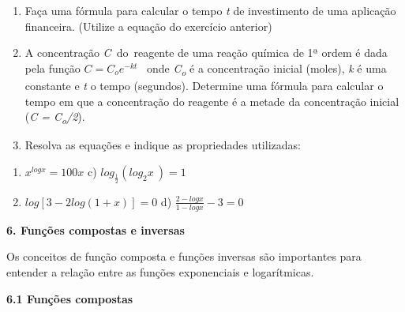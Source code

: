 \documentclass[12pt]{article}
\begin{document}
\begin{enumerate}[label*={\fontsize{14pt}{14pt}\selectfont \textbf{\arabic*.}}]
\begin{enumerate}[label*={\fontsize{12pt}{12pt}\selectfont \arabic*.}]
	\item Faça uma fórmula para calcular o tempo \textit{t} de investimento de uma aplicação financeira. (Utilize a equação do exercício anterior)\par

	\item A concentração \textit{C}\ do\ reagente de uma reação química de 1ª ordem é dada pela função    \( C=C_{o}e^{-kt} \) \  onde \textit{C\textsubscript{o}} é a concentração inicial (moles), \textit{k} é uma constante e \textit{t} o tempo (segundos). Determine uma fórmula para calcular o tempo em que a concentração do reagente é a metade da concentração inicial (\textit{C = C\textsubscript{o}/2}).\par


\vspace{\baselineskip}
	\item Resolva as equações e indique as propriedades utilizadas:
\end{enumerate}\par

\begin{enumerate}
	\item  \( x^{logx}=100 x \) \tab \tab \tab c)  \( log_{\frac{1}{2}} \left( log_{2}x~  \right) =1 ^{} \) \par

	\item  \( log \left[ 3-2log \left( 1+x \right)  \right] =0 \) \tab \tab d)  \( \frac{2-logx}{1-logx}-3=0 \) 
\end{enumerate}\par


\vspace{\baselineskip}
\begin{justify}
{\fontsize{14pt}{16.8pt}\selectfont \textbf{6. Funções compostas e inversas}\par}
\end{justify}\par

\begin{justify}
\tab Os conceitos de função composta e funções inversas são importantes para entender a relação entre as funções exponenciais e logarítmicas.
\end{justify}\par


\vspace{\baselineskip}
\begin{justify}
\textbf{6.1 Funções compostas}
\end{justify}\par


\end{enumerate}
\end{document}
